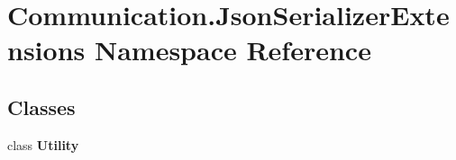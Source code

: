 \hypertarget{namespace_communication_1_1_json_serializer_extensions}{}\section{Communication.\+Json\+Serializer\+Extensions Namespace Reference}
\label{namespace_communication_1_1_json_serializer_extensions}
\subsection*{Classes}
\begin{DoxyCompactItemize}
\item 
class {\bfseries Utility}
\end{DoxyCompactItemize}
